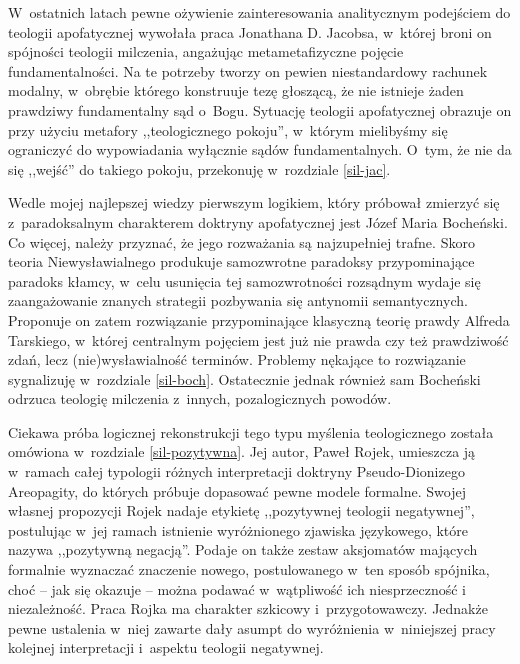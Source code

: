 W~ostatnich latach pewne ożywienie zainteresowania analitycznym podejściem do teologii apofatycznej wywołała praca Jonathana D. Jacobsa, w~której broni on spójności teologii milczenia, angażując metametafizyczne pojęcie fundamentalności. Na te potrzeby tworzy on pewien niestandardowy rachunek modalny, w~obrębie którego konstruuje tezę głoszącą, że nie istnieje żaden prawdziwy fundamentalny sąd o~Bogu. Sytuację teologii apofatycznej obrazuje on przy użyciu metafory ,,teologicznego pokoju'', w~którym mielibyśmy się ograniczyć do wypowiadania wyłącznie sądów fundamentalnych. O~tym, że nie da się ,,wejść'' do takiego pokoju, przekonuję w~rozdziale \ref{sil-jac}.

Wedle mojej najlepszej wiedzy pierwszym logikiem, który próbował zmierzyć się z~paradoksalnym charakterem doktryny apofatycznej jest Józef Maria Bocheński. Co więcej, należy przyznać, że jego rozważania są najzupełniej trafne. Skoro teoria Niewysławialnego produkuje samozwrotne paradoksy przypominające paradoks kłamcy, w~celu usunięcia tej samozwrotności rozsądnym wydaje się zaangażowanie znanych strategii pozbywania się antynomii semantycznych. Proponuje on zatem rozwiązanie przypominające klasyczną teorię prawdy Alfreda Tarskiego, w~której centralnym pojęciem jest już nie prawda czy też prawdziwość zdań, lecz (nie)wysławialność terminów. Problemy nękające to rozwiązanie sygnalizuję w~rozdziale \ref{sil-boch}. Ostatecznie jednak również sam Bocheński odrzuca teologię milczenia z~innych, pozalogicznych powodów.

Ciekawa próba logicznej rekonstrukcji tego typu myślenia teologicznego została omówiona w~rozdziale \ref{sil-pozytywna}. Jej autor, Paweł Rojek, umieszcza ją w~ramach całej typologii różnych interpretacji doktryny Pseudo-Dionizego Areopagity, do których próbuje dopasować pewne modele formalne. Swojej własnej propozycji Rojek nadaje etykietę ,,pozytywnej teologii negatywnej'', postulując w~jej ramach istnienie wyróżnionego zjawiska językowego, które nazywa ,,pozytywną negacją''. Podaje on także zestaw aksjomatów mających formalnie wyznaczać znaczenie nowego, postulowanego w~ten sposób spójnika, choć -- jak się okazuje -- można podawać w~wątpliwość ich niesprzeczność i niezależność. Praca Rojka ma charakter szkicowy i~przygotowawczy. Jednakże pewne ustalenia w~niej zawarte dały asumpt do wyróżnienia w~niniejszej pracy kolejnej interpretacji i~aspektu teologii negatywnej.

